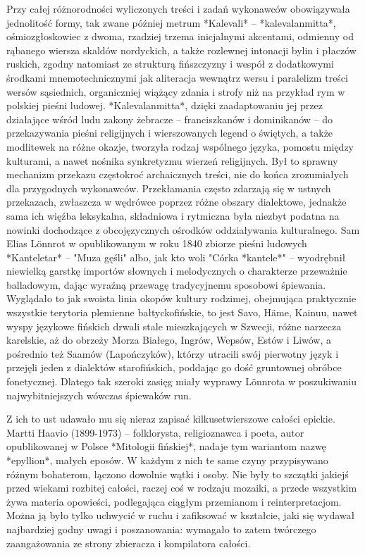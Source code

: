 Przy całej różnorodności wyliczonych treści i zadań wykonawców obowiązywała jednolitość formy, tak zwane później metrum *Kalevali* -- *kalevalanmitta*, ośmiozgłoskowiec z dwoma, rzadziej trzema inicjalnymi akcentami, odmienny od rąbanego wiersza skaldów nordyckich, a także rozlewnej intonacji bylin i płaczów ruskich, zgodny natomiast ze strukturą fińszczyzny i wespół z dodatkowymi środkami mnemotechnicznymi jak aliteracja wewnątrz wersu i paralelizm treści wersów sąsiednich, organiczniej wiążący zdania i strofy niż na przykład rym w polskiej pieśni ludowej. *Kalevalanmitta*, dzięki zaadaptowaniu jej przez działające wśród ludu zakony żebracze -- franciszkanów i dominikanów -- do przekazywania pieśni religijnych i wierszowanych legend o świętych, a także modlitewek na różne okazje, tworzyła rodzaj wspólnego języka, pomostu między kulturami, a nawet nośnika synkretyzmu wierzeń religijnych. Był to sprawny mechanizm przekazu częstokroć archaicznych treści, nie do końca zrozumiałych dla przygodnych wykonawców. Przekłamania często zdarzają się w ustnych przekazach, zwłaszcza w wędrówce poprzez różne obszary dialektowe, jednakże sama ich więźba leksykalna, składniowa i rytmiczna była niezbyt podatna na nowinki dochodzące z obcojęzycznych ośrodków oddziaływania kulturalnego. Sam Elias Lönnrot w opublikowanym w roku 1840 zbiorze pieśni ludowych *Kanteletar* -- "Muza gęśli" albo, jak kto woli "Córka *kantele*" -- wyodrębnił niewielką garstkę importów słownych i melodycznych o charakterze przeważnie balladowym, dając wyraźną przewagę tradycyjnemu sposobowi śpiewania. Wyglądało to jak swoista linia okopów kultury rodzimej, obejmująca praktycznie wszystkie terytoria plemienne bałtyckofińskie, to jest Savo, Häme, Kainuu, nawet wyspy językowe fińskich drwali stale mieszkających w Szwecji, różne narzecza karelskie, aż do obrzeży Morza Białego, Ingrów, Wepsów, Estów i Liwów, a pośrednio też Saamów (Lapończyków), którzy utracili swój pierwotny język i przejęli jeden z dialektów starofińskich, poddając go dość gruntownej obróbce fonetycznej. Dlatego tak szeroki zasięg miały wyprawy Lönnrota w poszukiwaniu najwybitniejszych wówczas śpiewaków run.

Z ich to ust udawało mu się nieraz zapisać kilkusetwierszowe całości epickie. Martti Haavio (1899-1973) -- folklorysta, religioznawca i poeta, autor opublikowanej w Polsce *Mitologii fińskiej*, nadaje tym wariantom nazwę *epyllion*, małych eposów. W każdym z nich te same czyny przypisywano różnym bohaterom, łączono dowolnie wątki i osoby. Nie były to szczątki jakiejś przed wiekami rozbitej całości, raczej coś w rodzaju mozaiki, a przede wszystkim żywa materia opowieści, podlegająca ciągłym przemianom i reinterpretacjom. Można ją było tylko uchwycić w ruchu i zafiksować w kształcie, jaki się wydawał najbardziej godny uwagi i poszanowania: wymagało to zatem twórczego zaangażowania ze strony zbieracza i kompilatora całości.

